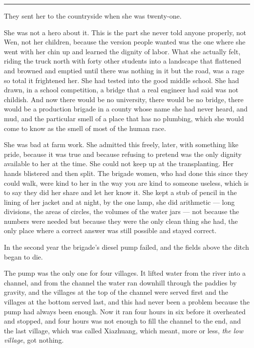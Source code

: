 \begin{center}\rule{0.3\linewidth}{0.4pt}\end{center}

They sent her to the countryside when she was twenty-one.

She was not a hero about it. This is the part she never told anyone properly, not Wen, not her children, because the version people wanted was the one where she went with her chin up and learned the dignity of labor. What she actually felt, riding the truck north with forty other students into a landscape that flattened and browned and emptied until there was nothing in it but the road, was a rage so total it frightened her. She had tested into the good middle school. She had drawn, in a school competition, a bridge that a real engineer had said was not childish. And now there would be no university, there would be no bridge, there would be a production brigade in a county whose name she had never heard, and mud, and the particular smell of a place that has no plumbing, which she would come to know as the smell of most of the human race.

She was bad at farm work. She admitted this freely, later, with something like pride, because it was true and because refusing to pretend was the only dignity available to her at the time. She could not keep up at the transplanting. Her hands blistered and then split. The brigade women, who had done this since they could walk, were kind to her in the way you are kind to someone useless, which is to say they did her share and let her know it. She kept a stub of pencil in the lining of her jacket and at night, by the one lamp, she did arithmetic --- long divisions, the areas of circles, the volumes of the water jars --- not because the numbers were needed but because they were the only clean thing she had, the only place where a correct answer was still possible and stayed correct.

In the second year the brigade's diesel pump failed, and the fields above the ditch began to die.

The pump was the only one for four villages. It lifted water from the river into a channel, and from the channel the water ran downhill through the paddies by gravity, and the villages at the top of the channel were served first and the villages at the bottom served last, and this had never been a problem because the pump had always been enough. Now it ran four hours in six before it overheated and stopped, and four hours was not enough to fill the channel to the end, and the last village, which was called Xiazhuang, which meant, more or less, \emph{the low village}, got nothing.

